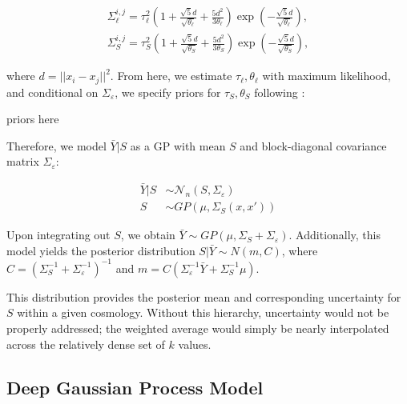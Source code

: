 \documentclass[11pt]{article}
\begin{document}
\begin{align}
\Sigma_\ell^{i,j} = \tau_\ell^2  \left( 1 + \frac{\sqrt{5}d}{\sqrt{\theta_\ell}} + \frac{5d^2}{3\theta_\ell}\right) \exp\left(-\frac{\sqrt{5}d}{\sqrt{\theta_\ell}}\right),\\
\Sigma_S^{i,j} = \tau_S^2  \left( 1 + \frac{\sqrt{5}d}{\sqrt{\theta_S}} + \frac{5d^2}{3\theta_S}\right) \exp\left(-\frac{\sqrt{5}d}{\sqrt{\theta_S}}\right),
\end{align}

where $d=||x_i-x_j||^2$. From here, we estimate $\tau_\ell, \theta_\ell$ with maximum likelihood, and conditional on $\Sigma_\varepsilon$, we specify priors for $\tau_S, \theta_S$ following \cite{sauer2023active}:

priors here


Therefore, we model $\bar Y|S$ as a GP with mean $S$ and block-diagonal covariance matrix $\Sigma_\varepsilon$:

$$
\begin{aligned}
\bar Y|S &\sim \mathcal{N}_n(S,\Sigma_\varepsilon) \\
S &\sim GP\left(\mu, \Sigma_S(x,x')\right)
\end{aligned}
$$

Upon integrating out $S$, we obtain $\bar Y \sim GP(\mu, \Sigma_S+\Sigma_\varepsilon)$. Additionally, this model yields the posterior distribution $S|\bar Y \sim N(m, C)$, where $C=\left(\Sigma_S^{-1}+\Sigma_\varepsilon^{-1}\right)^{-1}$ and $m=C\left(\Sigma_\varepsilon^{-1}\bar Y+\Sigma_S^{-1}\mu\right)$. 

This distribution provides the posterior mean and corresponding uncertainty for $S$ within a given cosmology. Without this hierarchy, uncertainty would not be properly addressed; the weighted average would simply be nearly interpolated across the relatively dense set of $k$ values.

\subsection{Deep Gaussian Process Model}
\end{document}
